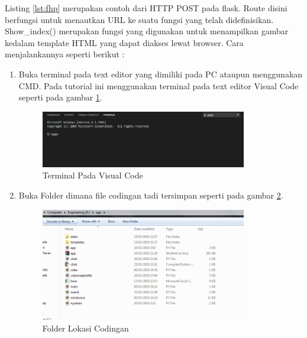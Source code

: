 Listing \ref{lst:fhp} merupakan contoh dari HTTP POST pada flask. Route disini berfungsi untuk menautkan URL ke suatu fungsi yang telah didefinisikan. Show\_index() merupakan fungsi yang digunakan untuk menampilkan gambar kedalam template HTML yang dapat diakses lewat browser. Cara menjalankannya seperti berikut : 
\begin{enumerate}
\item Buka terminal pada text editor yang dimiliki pada PC ataupun menggunakan CMD. Pada tutorial ini menggunakan terminal pada text editor Visual Code seperti pada gambar \ref{fig:tvc}.
\begin{figure}[!htbp]
	\centerline{\includegraphics[width=0.85\textwidth]{figures/11/tvc.PNG}}
	\caption{Terminal Pada Visual Code}
	\label{fig:tvc}
\end{figure}

\item Buka Folder dimana file codingan tadi tersimpan seperti pada gambar \ref{fig:flc}.
\begin{figure}[!htbp]
	\centerline{\includegraphics[width=0.85\textwidth]{figures/11/flc.PNG}}
	\caption{Folder Lokasi Codingan}
	\label{fig:flc}
\end{figure}


\end{enumerate}
